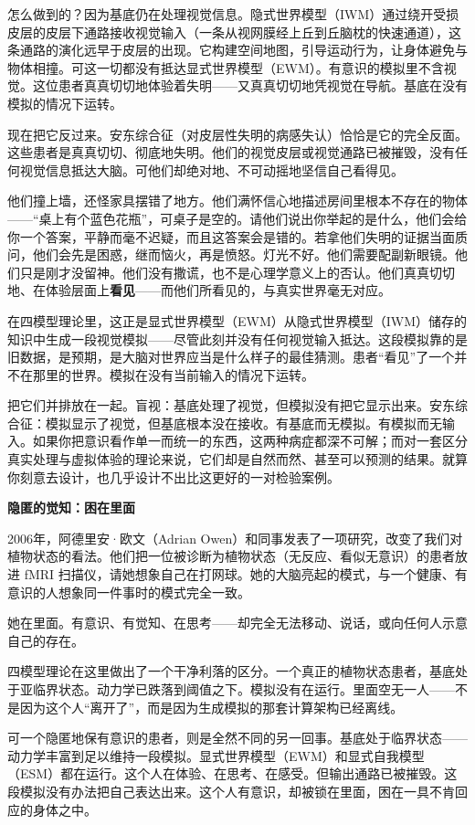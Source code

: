\documentclass[11pt, twoside, openright]{book}
\begin{document}
怎么做到的？因为基底仍在处理视觉信息。隐式世界模型（IWM）通过绕开受损皮层的皮层下通路接收视觉输入（一条从视网膜经上丘到丘脑枕的快速通道），这条通路的演化远早于皮层的出现。它构建空间地图，引导运动行为，让身体避免与物体相撞。可这一切都没有抵达显式世界模型（EWM）。有意识的模拟里不含视觉。这位患者真真切切地体验着失明------又真真切切地凭视觉在导航。基底在没有模拟的情况下运转。

现在把它反过来。安东综合征（对皮层性失明的病感失认）恰恰是它的完全反面。这些患者是真真切切、彻底地失明。他们的视觉皮层或视觉通路已被摧毁，没有任何视觉信息抵达大脑。可他们却绝对地、不可动摇地坚信自己看得见。

他们撞上墙，还怪家具摆错了地方。他们满怀信心地描述房间里根本不存在的物体------“桌上有个蓝色花瓶”，可桌子是空的。请他们说出你举起的是什么，他们会给你一个答案，平静而毫不迟疑，而且这答案会是错的。若拿他们失明的证据当面质问，他们会先是困惑，继而恼火，再是愤怒。灯光不好。他们需要配副新眼镜。他们只是刚才没留神。他们没有撒谎，也不是心理学意义上的否认。他们真真切切地、在体验层面上\textbf{看见}------而他们所看见的，与真实世界毫无对应。

在四模型理论里，这正是显式世界模型（EWM）从隐式世界模型（IWM）储存的知识中生成一段视觉模拟------尽管此刻并没有任何视觉输入抵达。这段模拟靠的是旧数据，是预期，是大脑对世界应当是什么样子的最佳猜测。患者“看见”了一个并不在那里的世界。模拟在没有当前输入的情况下运转。

把它们并排放在一起。盲视：基底处理了视觉，但模拟没有把它显示出来。安东综合征：模拟显示了视觉，但基底根本没在接收。有基底而无模拟。有模拟而无输入。如果你把意识看作单一而统一的东西，这两种病症都深不可解；而对一套区分真实处理与虚拟体验的理论来说，它们却是自然而然、甚至可以预测的结果。就算你刻意去设计，也几乎设计不出比这更好的一对检验案例。

\textbf{隐匿的觉知：困在里面}

2006年，阿德里安·欧文（Adrian Owen）和同事发表了一项研究，改变了我们对植物状态的看法。他们把一位被诊断为植物状态（无反应、看似无意识）的患者放进 fMRI 扫描仪，请她想象自己在打网球。她的大脑亮起的模式，与一个健康、有意识的人想象同一件事时的模式完全一致。

她在里面。有意识、有觉知、在思考------却完全无法移动、说话，或向任何人示意自己的存在。

四模型理论在这里做出了一个干净利落的区分。一个真正的植物状态患者，基底处于亚临界状态。动力学已跌落到阈值之下。模拟没有在运行。里面空无一人------不是因为这个人“离开了”，而是因为生成模拟的那套计算架构已经离线。

可一个隐匿地保有意识的患者，则是全然不同的另一回事。基底处于临界状态------动力学丰富到足以维持一段模拟。显式世界模型（EWM）和显式自我模型（ESM）都在运行。这个人在体验、在思考、在感受。但输出通路已被摧毁。这段模拟没有办法把自己表达出来。这个人有意识，却被锁在里面，困在一具不肯回应的身体之中。
\end{document}
